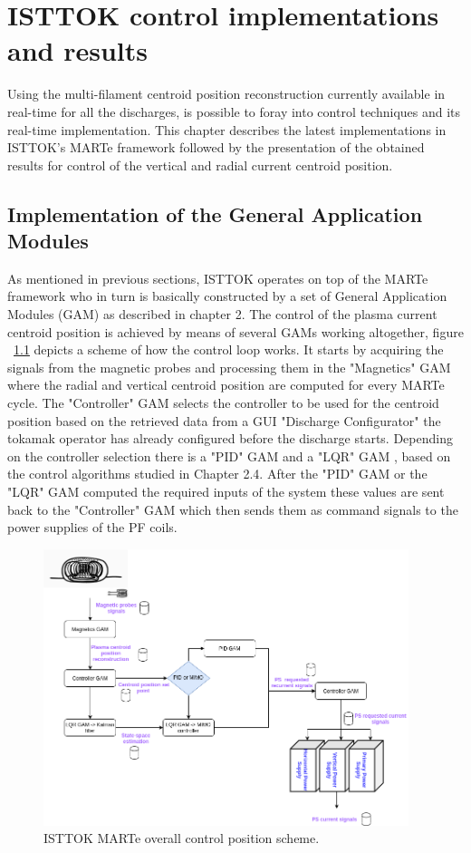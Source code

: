 \chapter{ISTTOK control implementations and results }

Using the multi-filament centroid position reconstruction currently available in real-time for all the discharges, is possible to foray into control techniques and its real-time implementation. This chapter describes the latest implementations in ISTTOK's  MARTe framework followed by the presentation of the obtained results for control of the vertical and radial current centroid position.

\section{Implementation of the General Application Modules }

As mentioned in previous sections, ISTTOK operates on top of the MARTe framework who in turn is basically constructed by a set of General Application Modules (GAM) as described in chapter 2. The control of the plasma current centroid position is achieved by means of several GAMs working altogether,  figure ~\ref{GAMsDiags} depicts a scheme of how the control loop works. It starts by acquiring  the signals from the magnetic probes and processing them in the "Magnetics" GAM where the radial and vertical centroid position are computed for every MARTe cycle. The "Controller" GAM selects the controller to be used for the centroid position based on the retrieved data from a GUI "Discharge Configurator" the tokamak operator has already configured before the discharge starts. Depending on the controller selection there is a "PID" GAM and a "LQR" GAM , based on the control algorithms studied in Chapter 2.4. After the "PID" GAM or the "LQR" GAM computed the required  inputs of the system these values are sent back to the "Controller" GAM which then sends them as command signals to the power supplies of the PF coils.

\begin{figure}[h]
	\centering
	\includegraphics[width=0.95\textwidth]{Chp5/GAMsDiagram.png}	
	\caption{ISTTOK MARTe overall control position  scheme. \label{GAMsDiags}}
\end{figure}

